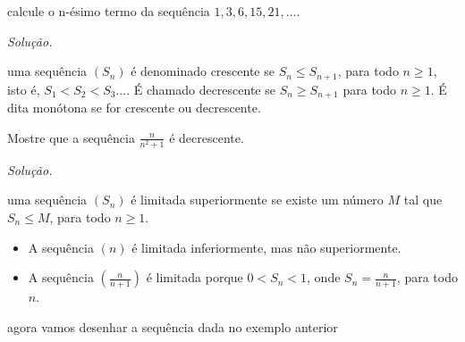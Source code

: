 \begin{ex} calcule o n-ésimo termo da sequência $1,3,6,15,21,...$.
\end{ex}
\textit{Solução.}
\vspace*{5cm}
\begin{df}
uma sequência $\left( S_{n}\right) $ é denominado crescente se $S_{n}\leq S_{n+1}$, para todo $n\geq1$, isto é, $S_{1}<S_{2}<S_{3}...$. É chamado decrescente se $S_{n} \geq S_{n+1}$ para todo $n\geq1$. É dita monótona se for crescente ou decrescente.  
\end{df}
\begin{ex} Mostre que a sequência ${\frac{n}{n^{2}+1}}$ é decrescente.
\end{ex}
\textit{Solução.}
\vspace*{5cm}
\begin{df}
	uma sequência $\left( S_{n}\right) $ é limitada superiormente se existe um número $
	M$ tal que $S_{n}\leq M$, para todo $n\geq 1$. 
\end{df}
\begin{ex}
	
	\begin{itemize} 
	\item A sequência $\left( n\right) $ é limitada inferiormente, mas não superiormente.
	\item A sequência $\left( \frac{n}{n+1}\right)$ é limitada porque $0<S_{n}<1$, onde $S_{n}=\frac{n}{n+1}$, para todo $n$.
   \end{itemize}
\end{ex}
agora vamos desenhar a sequência dada no exemplo anterior
\vspace*{5cm}

